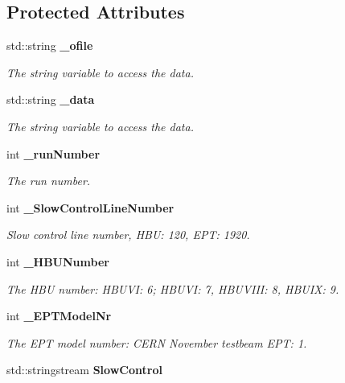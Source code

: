 \subsection*{Protected Attributes}
\begin{DoxyCompactItemize}
\item 
std\-::string {\bf \-\_\-ofile}
\begin{DoxyCompactList}\small\item\em The string variable to access the data. \end{DoxyCompactList}\item 
std\-::string {\bf \-\_\-data}\label{classmarlin_1_1LabviewConverter_a2a7a7963f225275d1b19989c356f4f9a}

\begin{DoxyCompactList}\small\item\em The string variable to access the data. \end{DoxyCompactList}\item 
int {\bf \-\_\-run\-Number}\label{classmarlin_1_1LabviewConverter_aeefca366348efb5bf87b819ec8807132}

\begin{DoxyCompactList}\small\item\em The run number. \end{DoxyCompactList}\item 
int {\bf \-\_\-\-Slow\-Control\-Line\-Number}\label{classmarlin_1_1LabviewConverter_ab280114ab31d4ff2bedfea28ec3a7fc8}

\begin{DoxyCompactList}\small\item\em Slow control line number, H\-B\-U\-: 120, E\-P\-T\-: 1920. \end{DoxyCompactList}\item 
int {\bf \-\_\-\-H\-B\-U\-Number}
\begin{DoxyCompactList}\small\item\em The H\-B\-U number\-: H\-B\-U\-V\-I\-: 6; H\-B\-U\-V\-I\-: 7, H\-B\-U\-V\-I\-I\-I\-: 8, H\-B\-U\-I\-X\-: 9. \end{DoxyCompactList}\item 
int {\bf \-\_\-\-E\-P\-T\-Model\-Nr}\label{classmarlin_1_1LabviewConverter_a8559206de7459e3c8d92dd74be0ae5e2}

\begin{DoxyCompactList}\small\item\em The E\-P\-T model number\-: C\-E\-R\-N November testbeam E\-P\-T\-: 1. \end{DoxyCompactList}\item 
std\-::stringstream {\bf Slow\-Control}\label{classmarlin_1_1LabviewConverter_a728e8504c1c11db843755f9d2f90df3b}


\end{DoxyCompactItemize}

